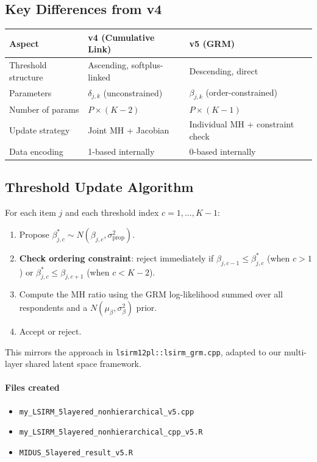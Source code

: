 \documentclass[11pt]{article}
\begin{document}
\subsection{Key Differences from v4}

\begin{center}
\begin{tabular}{lll}
\toprule
Aspect & v4 (Cumulative Link) & v5 (GRM) \\
\midrule
Threshold structure & Ascending, softplus-linked & Descending, direct \\
Parameters & $\delta_{j,k}$ (unconstrained) & $\beta_{j,k}$ (order-constrained) \\
Number of params & $P \times (K-2)$ & $P \times (K-1)$ \\
Update strategy & Joint MH + Jacobian & Individual MH + constraint check \\
Data encoding & 1-based internally & 0-based internally \\
\bottomrule
\end{tabular}
\end{center}

\subsection{Threshold Update Algorithm}

For each item $j$ and each threshold index $c = 1,\dots,K-1$:
\begin{enumerate}[leftmargin=2em]
  \item Propose $\beta_{j,c}^* \sim N(\beta_{j,c}, \sigma_\text{prop}^2)$.
  \item \textbf{Check ordering constraint}: reject immediately if $\beta_{j,c-1} \le \beta_{j,c}^*$ (when $c>1$) or $\beta_{j,c}^* \le \beta_{j,c+1}$ (when $c<K-2$).
  \item Compute the MH ratio using the GRM log-likelihood summed over all respondents and a $N(\mu_\beta, \sigma_\beta^2)$ prior.
  \item Accept or reject.
\end{enumerate}

This mirrors the approach in \texttt{lsirm12pl::lsirm\_grm.cpp}, adapted to our multi-layer shared latent space framework.

\paragraph{Files created}
\begin{itemize}[leftmargin=1.5em]
  \item \texttt{my\_LSIRM\_5layered\_nonhierarchical\_v5.cpp}
  \item \texttt{my\_LSIRM\_5layered\_nonhierarchical\_cpp\_v5.R}
  \item \texttt{MIDUS\_5layered\_result\_v5.R}
\end{itemize}
\end{document}
